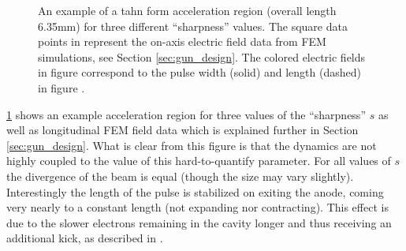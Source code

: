 \begin{figure}
  \centerline{
    \subfloat[][]{
      \label{fig:field_on_axis}
      
    }
    \subfloat[][]{
      \label{fig:tanh_sharpness}
      
    }
  }
  \caption[An example of a tanh form acceleration region for three different ``sharpness'' values]{
    An example of a tahn form acceleration region (overall length 6.35mm) for three different ``sharpness'' values.
    The square data points in \protect{} represent the on-axis electric field data from FEM simulations, see Section \ref{sec:gun_design}.
    The colored electric fields in figure \protect{} correspond to the pulse width (solid) and length (dashed) in figure \protect{}.
  }
  \label{fig:gun-sharpness}
\end{figure}

\ref{fig:gun-sharpness} shows an example acceleration region for three values of the ``sharpness'' $s$ as well as longitudinal FEM field data which is explained further in Section \ref{sec:gun_design}.
What is clear from this figure is that the dynamics are not highly coupled to the value of this hard-to-quantify parameter.
For all values of $s$ the divergence of the beam is equal (though the size may vary slightly).
Interestingly the length of the pulse is stabilized on exiting the anode, coming very nearly to a constant length (not expanding nor contracting).
This effect is due to the slower electrons remaining in the cavity longer and thus receiving an additional kick, as described in \cite{oudheusden_electron_2007}.
